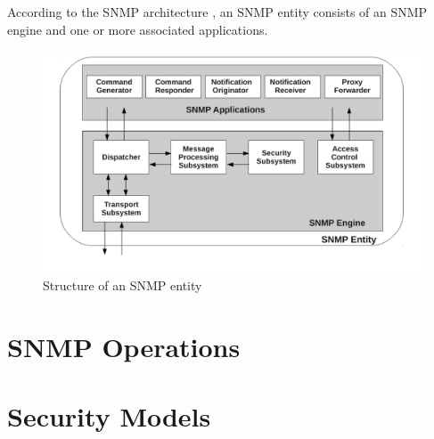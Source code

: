 According to the SNMP architecture \cite{rfc3411}, an SNMP entity consists of an SNMP engine and one or more associated applications.

\begin{figure}	
\begin{center}
    \includegraphics[scale = 0.6]{img/snmp-arch.pdf}
    \caption{Structure of an SNMP entity}   
	\label{fig:snmparch}
\end{center}
\end{figure}

\section{SNMP Operations}

\section{Security Models}

